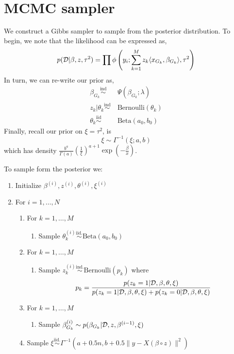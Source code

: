 \section{MCMC sampler}

We construct a Gibbs sampler to sample from the posterior distribution. To begin, we note that the likelihood can be expressed as,
\begin{equation}
    p(\mathcal{D} | \beta, z, \tau^2) = \prod \phi \left(y_i; \sum_{k = 1}^M z_k \langle x_{G_k}, \beta_{G_k} \rangle, \tau^2 \right)
\end{equation}
In turn, we can re-write our prior as,
\begin{equation}
\begin{aligned}
    \beta_{G_k} \overset{\text{ind}}{\sim} &\ \Psi(\beta_{G_k}; \lambda) \\
z_k | \theta_k \overset{\text{ind}}{\sim} &\ \text{Bernoulli}(\theta_k) \\
    \theta_k \overset{\text{iid}}{\sim} &\ \text{Beta}(a_0, b_0)
\end{aligned}
\end{equation}
Finally, recall our prior on $\xi = \tau^2$, is
\begin{equation}
    \xi \sim \Gamma^{-1}(\xi; a, b)
\end{equation}
which has density $ \frac{b^a}{\Gamma(a)} \left( \frac{1}{\xi} \right)^{a + 1} \exp\left( -\frac{\beta}{x} \right)$.

To sample form the posterior we:
\begin{enumerate}
    \itemsep0em
    \item Initialize $\beta^{(i)}, z^{(i)}, \theta^{(i)}, \xi^{(i)}$
    \item For $i = 1, \dots, N$
    \begin{enumerate}
	\item For $k = 1, \dots, M$
	\begin{enumerate}
	    \item Sample $\theta^{(i)}_{k} \overset{\text{iid.}}{\sim} \text{Beta}(a_0, b_0)$
	\end{enumerate}
	\item For $k = 1, \dots, M$
	\begin{enumerate}
	    \item Sample $z^{(i)}_{k} \overset{\text{ind.}}{\sim} \text{Bernoulli}(p_k)$
	    where
	    \begin{equation}
		p_k = \frac
		{p(z_k = 1 | \mathcal{D}, \beta, \theta, \xi)}
		{p(z_k = 1 | \mathcal{D}, \beta, \theta, \xi) + p(z_k = 0 | \mathcal{D}, \beta, \theta, \xi)}
	    \end{equation}
	\end{enumerate}
	\item For $k = 1, \dots, M$
	\begin{enumerate}
	    \item Sample $ \beta_{G_k}^{(i)} \sim p(\beta_{G_k} | \mathcal{D}, z, \beta^{(i-1)}, \xi)$
	\end{enumerate}
    \item Sample $\xi \overset{\text{iid.}}{\sim} \Gamma^{-1}(a + 0.5n, b + 0.5 \| y - X (\beta \circ z) \| ^2 )$
    \end{enumerate}
\end{enumerate}

